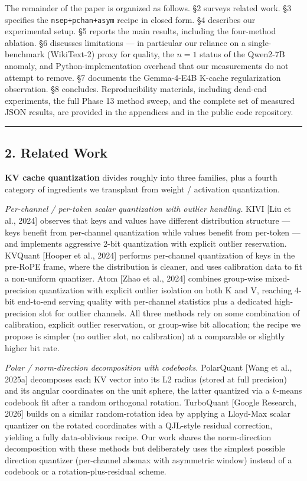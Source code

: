 \documentclass[
]{article}
\begin{document}
The remainder of the paper is organized as follows. §2 surveys related
work. §3 specifies the \texttt{nsep+pchan+asym} recipe in closed form.
§4 describes our experimental setup. §5 reports the main results,
including the four-method ablation. §6 discusses limitations --- in
particular our reliance on a single-benchmark (WikiText-2) proxy for
quality, the \(n = 1\) status of the Qwen2-7B anomaly, and
Python-implementation overhead that our measurements do not attempt to
remove. §7 documents the Gemma-4-E4B K-cache regularization observation.
§8 concludes. Reproducibility materials, including dead-end experiments,
the full Phase 13 method sweep, and the complete set of measured JSON
results, are provided in the appendices and in the public code
repository.

\begin{center}\rule{0.5\linewidth}{0.5pt}\end{center}

\subsection{2. Related Work}\label{related-work}

\textbf{KV cache quantization} divides roughly into three families, plus
a fourth category of ingredients we transplant from weight / activation
quantization.

\emph{Per-channel / per-token scalar quantization with outlier
handling.} KIVI {[}Liu et al., 2024{]} observes that keys and values
have different distribution structure --- keys benefit from per-channel
quantization while values benefit from per-token --- and implements
aggressive 2-bit quantization with explicit outlier reservation. KVQuant
{[}Hooper et al., 2024{]} performs per-channel quantization of keys in
the pre-RoPE frame, where the distribution is cleaner, and uses
calibration data to fit a non-uniform quantizer. Atom {[}Zhao et al.,
2024{]} combines group-wise mixed-precision quantization with explicit
outlier isolation on both K and V, reaching 4-bit end-to-end serving
quality with per-channel statistics plus a dedicated high-precision slot
for outlier channels. All three methods rely on some combination of
calibration, explicit outlier reservation, or group-wise bit allocation;
the recipe we propose is simpler (no outlier slot, no calibration) at a
comparable or slightly higher bit rate.

\emph{Polar / norm-direction decomposition with codebooks.} PolarQuant
{[}Wang et al., 2025a{]} decomposes each KV vector into its L2 radius
(stored at full precision) and its angular coordinates on the unit
sphere, the latter quantized via a \(k\)-means codebook fit after a
random orthogonal rotation. TurboQuant {[}Google Research, 2026{]}
builds on a similar random-rotation idea by applying a Lloyd-Max scalar
quantizer on the rotated coordinates with a QJL-style residual
correction, yielding a fully data-oblivious recipe. Our work shares the
norm-direction decomposition with these methods but deliberately uses
the simplest possible direction quantizer (per-channel absmax with
asymmetric window) instead of a codebook or a rotation-plus-residual
scheme.
\end{document}
